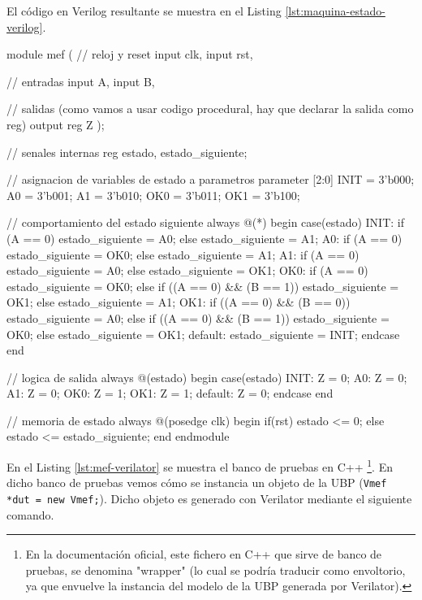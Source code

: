 El código en Verilog resultante se muestra en el Listing \ref{lst:maquina-estado-verilog}.

\begin{mycode}[style=verilogstyle, caption={Máquina de estado en Verilog.}, label=lst:maquina-estado-verilog]
module mef (
            // reloj y reset
            input clk,
            input rst,

            // entradas
            input A,
            input B,

            // salidas (como vamos a usar codigo procedural, hay que declarar la salida como reg)
            output reg Z
           );

// senales internas
reg estado, estado_siguiente;

// asignacion de variables de estado a parametros
parameter [2:0] INIT = 3'b000;
                A0 = 3'b001;
                A1 = 3'b010;
                OK0 = 3'b011;
                OK1 = 3'b100;

// comportamiento del estado siguiente
always @(*) begin
    case(estado)
        INIT: if (A == 0) estado_siguiente = A0;
              else estado_siguiente = A1;
        A0: if (A == 0) estado_siguiente = OK0;
            else estado_siguiente = A1;
        A1: if (A == 0) estado_siguiente = A0;
            else estado_siguiente = OK1;
        OK0: if (A == 0) estado_siguiente = OK0;
             else if ((A == 0) && (B == 1)) estado_siguiente = OK1;
             else estado_siguiente = A1;
        OK1: if ((A == 0) && (B == 0))             estado_siguiente = A0;
        else if ((A == 0) && (B == 1)) estado_siguiente = OK0;
        else estado_siguiente = OK1;
        default: estado_siguiente = INIT;
    endcase
end

// logica de salida
always @(estado) begin
    case(estado)
        INIT: Z = 0;
        A0: Z = 0;
        A1: Z = 0;
        OK0: Z = 1;
        OK1: Z = 1;
        default: Z = 0;
    endcase
end

// memoria de estado
always @(posedge clk) begin
    if(rst)
        estado <= 0;
    else
        estado <= estado_siguiente;
end
endmodule
\end{mycode}

En el Listing \ref{lst:mef-verilator} se muestra el banco de pruebas en C++ \footnote{En la documentación oficial, este fichero en C++ que sirve de banco de pruebas, se denomina "wrapper" (lo cual se podría traducir como envoltorio, ya que envuelve la instancia del modelo de la UBP generada por Verilator).}. En dicho banco de pruebas vemos cómo se instancia un objeto de la UBP (\verb|Vmef *dut = new Vmef;|). Dicho objeto es generado con Verilator mediante el siguiente comando.

